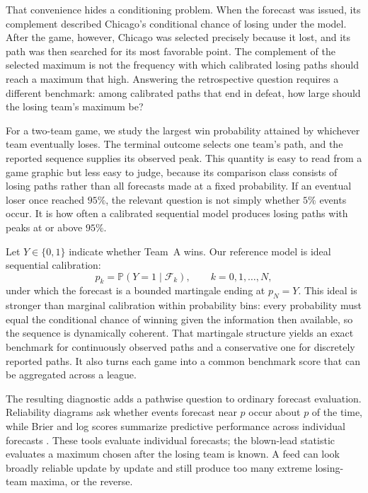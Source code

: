 \documentclass[12pt,letterpaper]{article}  %
\renewcommand{\P}{\mathbb{P}}
\theoremstyle{plain}
\theoremstyle{definition}
\begin{document}
That convenience hides a conditioning problem.
When the \ChicagoMaxWP{} forecast was issued, its complement described Chicago's conditional chance of losing under the model.
After the game, however, Chicago was selected precisely because it lost, and its path was then searched for its most favorable point.
The complement of the selected maximum is not the frequency with which calibrated losing paths should reach a maximum that high.
Answering the retrospective question requires a different benchmark: among calibrated paths that end in defeat, how large should the losing team's maximum be?

For a two-team game, we study the largest win probability attained by whichever team eventually loses.
The terminal outcome selects one team's path, and the reported sequence supplies its observed peak.
This quantity is easy to read from a game graphic but less easy to judge, because its comparison class consists of losing paths rather than all forecasts made at a fixed probability.
If an eventual loser once reached $95\%$, the relevant question is not simply whether $5\%$ events occur.
It is how often a calibrated sequential model produces losing paths with peaks at or above $95\%$.

Let $Y\in\{0,1\}$ indicate whether Team~A wins.
Our reference model is ideal sequential calibration:
\[
p_k=\P(Y=1\mid \mathcal F_k),\qquad k=0,1,\dots,N,
\]
under which the forecast is a bounded martingale ending at $p_N=Y$.
This ideal is stronger than marginal calibration within probability bins: every probability must equal the conditional chance of winning given the information then available, so the sequence is dynamically coherent.
That martingale structure yields an exact benchmark for continuously observed paths and a conservative one for discretely reported paths.
It also turns each game into a common benchmark score that can be aggregated across a league.

The resulting diagnostic adds a pathwise question to ordinary forecast evaluation.
Reliability diagrams ask whether events forecast near $p$ occur about $p$ of the time, while Brier and log scores summarize predictive performance across individual forecasts \citep{Brier1950,Murphy1973,DeGrootFienberg1983,Dawid1982,GneitingRaftery2007}.
These tools evaluate individual forecasts; the blown-lead statistic evaluates a maximum chosen after the losing team is known.
A feed can look broadly reliable update by update and still produce too many extreme losing-team maxima, or the reverse.
\end{document}
